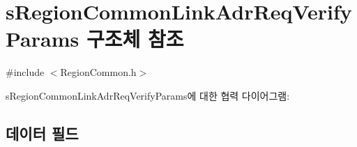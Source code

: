 \hypertarget{structs_region_common_link_adr_req_verify_params}{}\section{s\+Region\+Common\+Link\+Adr\+Req\+Verify\+Params 구조체 참조}
\label{structs_region_common_link_adr_req_verify_params}


{\ttfamily \#include $<$Region\+Common.\+h$>$}



s\+Region\+Common\+Link\+Adr\+Req\+Verify\+Params에 대한 협력 다이어그램\+:
\subsection*{데이터 필드}

